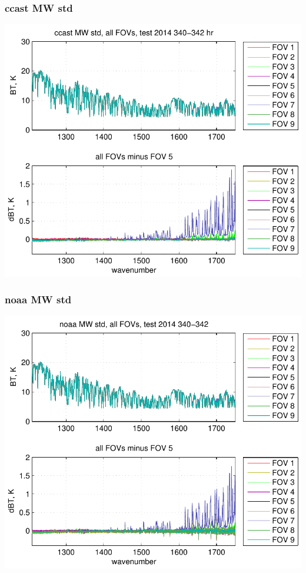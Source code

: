 \begin{frame}
\frametitle{ccast MW std}

\begin{center}
  \includegraphics[scale=0.7]{figures/ccast_MW_std_2014_340-342_hr.pdf}
\end{center}

\end{frame}
\begin{frame}
\frametitle{noaa MW std}

\begin{center}
  \includegraphics[scale=0.7]{figures/noaa_MW_std_2014_340-342.pdf}
\end{center}

\end{frame}
